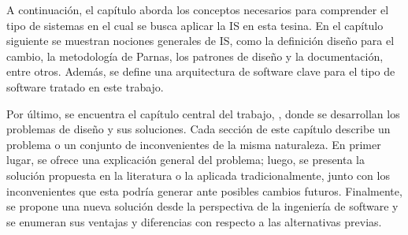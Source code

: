 A continuación, el capítulo  aborda los conceptos necesarios para comprender el tipo de sistemas en el cual se busca aplicar la IS en esta tesina. En el capítulo siguiente  se muestran nociones generales de IS, como la definición diseño para el cambio, la metodología de Parnas, los patrones de diseño y la documentación, entre otros. Además, se define una arquitectura de software clave para el tipo de software tratado en este trabajo.

Por último, se encuentra el capítulo central del trabajo, , donde se desarrollan los problemas de diseño y sus soluciones. Cada sección de este capítulo describe un problema o un conjunto de inconvenientes de la misma naturaleza. En primer lugar, se ofrece una explicación general del problema; luego, se presenta la solución propuesta en la literatura o la aplicada tradicionalmente, junto con los inconvenientes que esta podría generar ante posibles cambios futuros. Finalmente, se propone una nueva solución desde la perspectiva de la ingeniería de software y se enumeran sus ventajas y diferencias con respecto a las alternativas previas.


